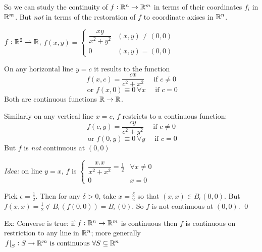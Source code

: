 So we can study the continuity of $f: \mathbb{R}^n \to \mathbb{R}^m$ in terms of their coordinates $f_i$ in $\mathbb{R}^m$. But \emph{not} in terms of the restoration of $f$ to coordinate axises in $\mathbb{R}^n$.\vspace*{15pt}

\begin{example}
$f: \mathbb{R}^2 \to \mathbb{R}$, $f(x,y) = \begin{cases}
 	\dfrac{xy}{x^2 + y^2} & (x,y) \neq (0,0)\\
 	0 & (x,y) = (0,0)
 \end{cases}$
 
 On any horizontal line $y =c$ it results to the function 
 \[f(x,c) = \frac{cx}{c^2 + x^2} \quad \text{ if } c \neq 0\]
 \[\text{ or } f(x,0) \equiv 0 ~\forall x \quad \text{ if } c = 0\]
 Both are continuous functions $\mathbb{R} \to \mathbb{R}$. 
 
 Similarly on any vertical line $x = c$, $f$ restricts to a continuous function: 
  \[f(c,y) = \frac{cy}{c^2 + y^2} \quad \text{ if } c \neq 0\]
 \[\text{ or } f(0,y) \equiv 0 ~\forall y \quad \text{ if } c = 0\]
 But $f$ is \emph{not} continuous at $(0,0)$
 
 \emph{Idea:} on line $y=x$, $f$ is $\begin{cases}
	\dfrac{x.x}{x^2 + x^2} = \frac{1}{2} & \forall x \neq 0\\
	0 & x = 0
\end{cases}$

Pick $\epsilon = \frac{1}{2}$. Then for any $\delta > 0$, take $x = \frac{\delta}{2}$ so that $(x,x) \in B_\epsilon(0,0)$. But $f(x,x) = \frac{1}{2} \not\in B_\epsilon(f(0,0)) = B_\epsilon(0)$. So $f$ is not continuous at $(0,0)$. \qed
\end{example}

Ex: Converse is true: if $f: \mathbb{R}^n \to \mathbb{R}^m$ is continuous then $f$ is continuous on restriction to any line in $\mathbb{R}^n$; more generally $\left.f\right|_S: S \to \mathbb{R}^m \text{ is continuous } \forall S \subseteq \mathbb{R}^n$



